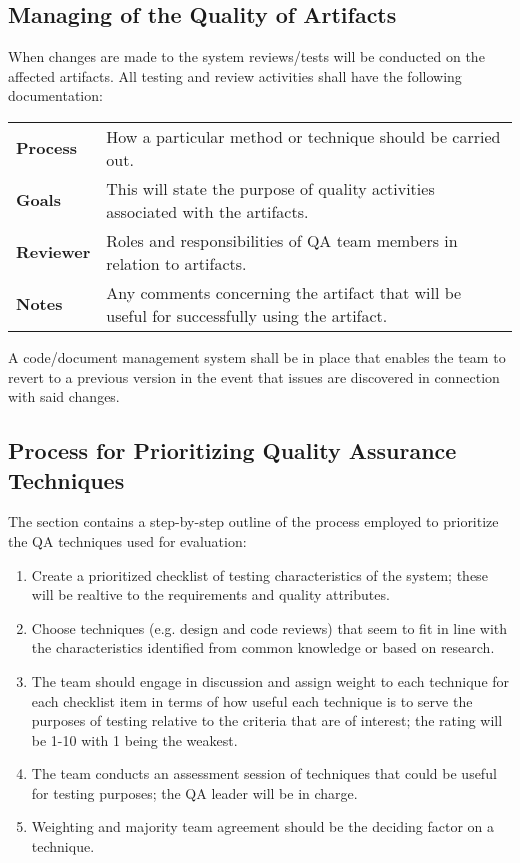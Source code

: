 \documentclass[a3paper, 11pt]{article}
\begin{document}
\subsection{Managing of the Quality of Artifacts}
When changes are made to the system reviews/tests will be conducted on the affected artifacts. 
All testing and review activities shall have the following documentation:
\begin{center}
	\begin{tabular}{lp{14cm}}
		\textbf{Process} & How a particular method or technique should be carried out. \\
		\textbf{Goals} & This will state the purpose of quality activities associated with the artifacts. \\
		\textbf{Reviewer} & Roles and responsibilities of QA team members in relation to artifacts. \\
		\textbf{Notes} & Any comments concerning the artifact that will be useful for successfully using the artifact. \\
	\end{tabular}
\end{center}
A code/document management system shall be in place that enables the team to revert to a previous version in the event that issues are discovered in connection with said changes. 

\subsection{Process for Prioritizing Quality Assurance Techniques}
The section contains a step-by-step outline of the process employed to prioritize the QA techniques used for evaluation:
\begin{enumerate}
	\item Create a prioritized checklist of testing characteristics of the system; these will be realtive to the requirements and quality attributes. 
	\item Choose techniques (e.g. design and code reviews) that seem to fit in line with the characteristics identified from common knowledge or based on research. 
	\item The team should engage in discussion and assign weight to each technique for each checklist item in terms of how useful each technique is to serve the purposes of testing relative to the criteria that are of interest; the rating will be 1-10 with 1 being the weakest. 
	\item The team conducts an assessment session of techniques that could be useful for testing purposes; the QA leader will be in charge. 
	\item Weighting and majority team agreement should be the deciding factor on a technique. 
\end{enumerate}
\end{document}
